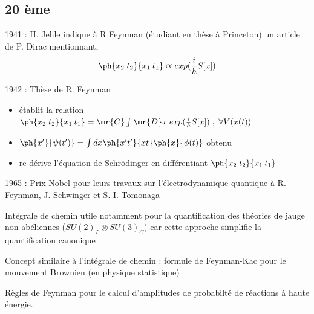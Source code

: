 \subsection{20 ème}
1941 : H. Jehle indique à R Feynman (étudiant en thèse à Princeton) un article
de P. Dirac mentionnant,
\[
\ph{x_2\;t_2}{x_1\:t_1} \varpropto exp(\frac{i}{\hbar}S[x])
\]

1942 : Thèse de R. Feynman
\begin{itemize}[leftmargin=1cm, label=, itemsep=1pt]
\item établit la relation $\ph{x_2\;t_2}{x_1\:t_1}=\mr{C}\int\mr{D}x\;
exp(\frac{i}{\hbar}S[x])\;,\ \forall V(x(t))$
\item $\ph{x'}{\psi(t')}=\int dx\ph{x't'}{xt}\ph{x}{\phi(t)}$ obtenu
\item re-dérive l'équation de Schrödinger en différentiant
$\ph{x_2\;t_2}{x_1\:t_1}$
\end{itemize}

1965 : Prix Nobel pour leurs travaux sur l'électrodynamique quantique à R. Feynman, J. Schwinger et S.-I. Tomonaga

Intégrale de chemin utile notamment pour la quantification des théories de
jauge non-abéliennes ($SU(2)_L\otimes SU(3)_C$) car cette approche simplifie
la quantification canonique

Concept similaire à l'intégrale de chemin : formule de Feynman-Kac pour le mouvement Brownien (en physique statistique)

Règles de Feynman pour le calcul d'amplitudes de probabilté de réactions à
haute énergie.
